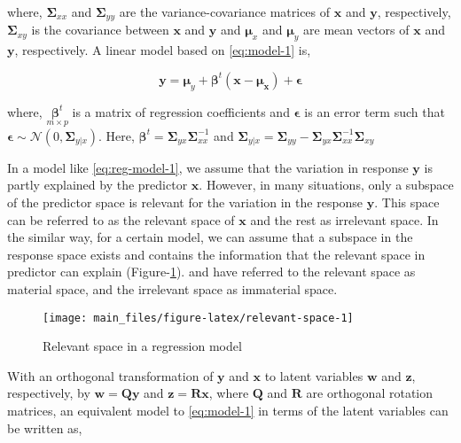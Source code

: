 \documentclass[review]{elsarticle}
\begin{document}
where, \(\boldsymbol{\Sigma}_{xx}\) and \(\boldsymbol{\Sigma}_{yy}\) are
the variance-covariance matrices of \(\mathbf{x}\) and \(\mathbf{y}\),
respectively, \(\boldsymbol{\Sigma}_{xy}\) is the covariance between
\(\mathbf{x}\) and \(\mathbf{y}\) and \(\boldsymbol{\mu}_x\) and
\(\boldsymbol{\mu}_y\) are mean vectors of \(\mathbf{x}\) and
\(\mathbf{y}\), respectively. A linear model based on \eqref{eq:model-1}
is,

\begin{equation}
\mathbf{y} = \boldsymbol{\mu}_y + 
  \boldsymbol{\beta}^t(\mathbf{x} - \boldsymbol{\mu_x}) + 
  \boldsymbol{\epsilon}
\label{eq:reg-model-1}
\end{equation}

where, \(\underset{m\times p}{\boldsymbol{\beta}^t}\) is a matrix of
regression coefficients and \(\boldsymbol{\epsilon}\) is an error term
such that
\(\boldsymbol{\epsilon} \sim \mathcal{N}(0, \boldsymbol{\Sigma}_{y|x})\).
Here,
\(\boldsymbol{\beta}^t = \mathbf{\Sigma}_{yx}\mathbf{\Sigma}_{xx}^{-1}\)
and
\(\boldsymbol{\Sigma}_{y|x} = \boldsymbol{\Sigma}_{yy} - \boldsymbol{\Sigma}_{yx}\boldsymbol{\Sigma}_{xx}^{-1}\boldsymbol{\Sigma}_{xy}\)

In a model like \eqref{eq:reg-model-1}, we assume that the variation in
response \(\mathbf{y}\) is partly explained by the predictor
\(\mathbf{x}\). However, in many situations, only a subspace of the
predictor space is relevant for the variation in the response
\(\mathbf{y}\). This space can be referred to as the relevant space of
\(\mathbf{x}\) and the rest as irrelevant space. In the similar way, for
a certain model, we can assume that a subspace in the response space
exists and contains the information that the relevant space in predictor
can explain (Figure-\ref{fig:relevant-space}). \citet{cook2010envelope}
and \citet{cook2015simultaneous} have referred to the relevant space as
material space, and the irrelevant space as immaterial space.

\begin{figure}

{\centering \texttt{[image: main\_files/figure-latex/relevant-space-1]} 

}

\caption{Relevant space in a regression model}\label{fig:relevant-space}
\end{figure}

With an orthogonal transformation of \(\mathbf{y}\) and \(\mathbf{x}\)
to latent variables \(\mathbf{w}\) and \(\mathbf{z}\), respectively, by
\(\mathbf{w=Qy}\) and \(\mathbf{z = Rx}\), where \(\mathbf{Q}\) and
\(\mathbf{R}\) are orthogonal rotation matrices, an equivalent model to
\eqref{eq:model-1} in terms of the latent variables can be written as,
\end{document}
